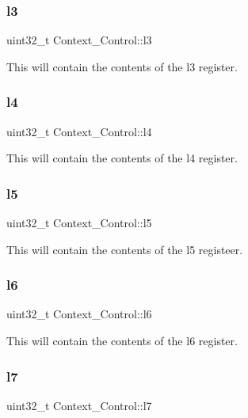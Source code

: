 \subsubsection{\texorpdfstring{l3}{l3}}
{\footnotesize\ttfamily uint32\+\_\+t Context\+\_\+\+Control\+::l3}

This will contain the contents of the l3 register. \mbox{\label{structContext__Control_a685ec2b563ccb847b974f28805f4e362}} 
\subsubsection{\texorpdfstring{l4}{l4}}
{\footnotesize\ttfamily uint32\+\_\+t Context\+\_\+\+Control\+::l4}

This will contain the contents of the l4 register. \mbox{\label{structContext__Control_a221da6843d317a569414376da582678c}} 
\subsubsection{\texorpdfstring{l5}{l5}}
{\footnotesize\ttfamily uint32\+\_\+t Context\+\_\+\+Control\+::l5}

This will contain the contents of the l5 registeer. \mbox{\label{structContext__Control_ad7769cbd7c421bd9b1d487ca4b45ca96}} 
\subsubsection{\texorpdfstring{l6}{l6}}
{\footnotesize\ttfamily uint32\+\_\+t Context\+\_\+\+Control\+::l6}

This will contain the contents of the l6 register. \mbox{\label{structContext__Control_ae2113997981819e2d13575ba525e22e9}} 
\subsubsection{\texorpdfstring{l7}{l7}}
{\footnotesize\ttfamily uint32\+\_\+t Context\+\_\+\+Control\+::l7}

